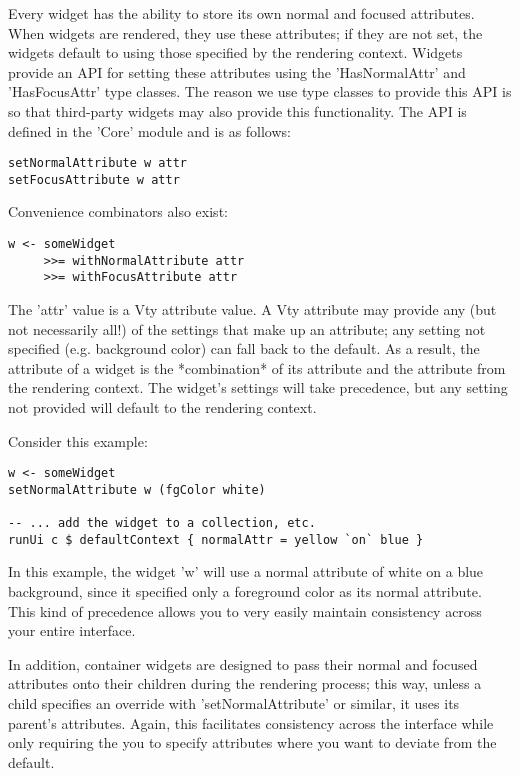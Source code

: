 Every widget has the ability to store its own normal and focused
attributes.  When widgets are rendered, they use these attributes; if
they are not set, the widgets default to using those specified by the
rendering context.  Widgets provide an API for setting these attributes
using the 'HasNormalAttr' and 'HasFocusAttr' type classes.  The reason
we use type classes to provide this API is so that third-party widgets
may also provide this functionality.  The API is defined in the 'Core'
module and is as follows:

\begin{verbatim}
setNormalAttribute w attr
setFocusAttribute w attr
\end{verbatim}

Convenience combinators also exist:

\begin{verbatim}
w <- someWidget
     >>= withNormalAttribute attr
     >>= withFocusAttribute attr
\end{verbatim}

The 'attr' value is a Vty attribute value.  A Vty attribute may provide
any (but not necessarily all!) of the settings that make up an
attribute; any setting not specified (e.g. background color) can fall
back to the default.  As a result, the attribute of a widget is the
*combination* of its attribute and the attribute from the rendering
context.  The widget's settings will take precedence, but any setting
not provided will default to the rendering context.

Consider this example:

\begin{verbatim}
w <- someWidget
setNormalAttribute w (fgColor white)

-- ... add the widget to a collection, etc.
runUi c $ defaultContext { normalAttr = yellow `on` blue }
\end{verbatim}

In this example, the widget 'w' will use a normal attribute of white on
a blue background, since it specified only a foreground color as its
normal attribute.  This kind of precedence allows you to very easily
maintain consistency across your entire interface.

In addition, container widgets are designed to pass their normal and
focused attributes onto their children during the rendering process;
this way, unless a child specifies an override with 'setNormalAttribute'
or similar, it uses its parent's attributes.  Again, this facilitates
consistency across the interface while only requiring the you to specify
attributes where you want to deviate from the default.

